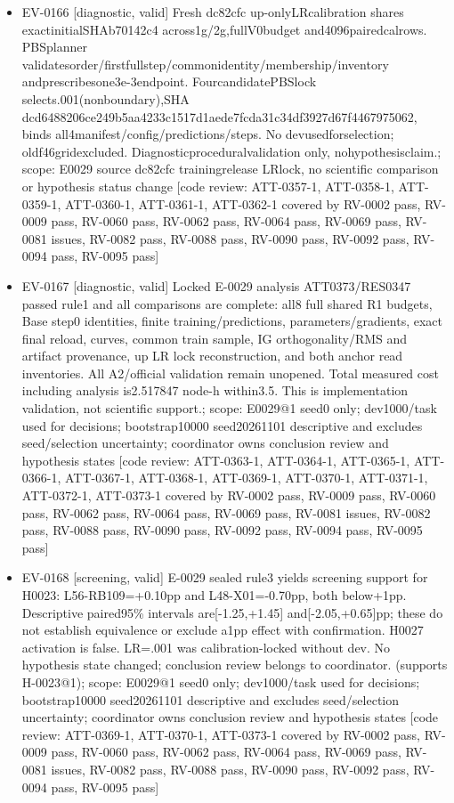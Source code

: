 \documentclass[11pt]{article}
\begin{document}
\begin{itemize}
\item EV-0166 [diagnostic, valid] Fresh dc82cfc up-onlyLRcalibration shares exactinitialSHAb70142c4 across1g/2g,fullV0budget and4096pairedcalrows. PBSplanner validatesorder/firstfullstep/commonidentity/membership/inventory andprescribesone3e-3endpoint. FourcandidatePBSlock selects.001(nonboundary),SHA dcd6488206ce249b5aa4233c1517d1aede7fcda31c34df3927d67f4467975062, binds all4manifest/config/predictions/steps. No devusedforselection; oldf46gridexcluded. Diagnosticproceduralvalidation only, nohypothesisclaim.; scope: E0029 source dc82cfc trainingrelease LRlock, no scientific comparison or hypothesis status change [code review: ATT-0357-1, ATT-0358-1, ATT-0359-1, ATT-0360-1, ATT-0361-1, ATT-0362-1 covered by RV-0002 pass, RV-0009 pass, RV-0060 pass, RV-0062 pass, RV-0064 pass, RV-0069 pass, RV-0081 issues, RV-0082 pass, RV-0088 pass, RV-0090 pass, RV-0092 pass, RV-0094 pass, RV-0095 pass]
\item EV-0167 [diagnostic, valid] Locked E-0029 analysis ATT0373/RES0347 passed rule1 and all comparisons are complete: all8 full shared R1 budgets, Base step0 identities, finite training/predictions, parameters/gradients, exact final reload, curves, common train sample, IG orthogonality/RMS and artifact provenance, up LR lock reconstruction, and both anchor read inventories. All A2/official validation remain unopened. Total measured cost including analysis is2.517847 node-h within3.5. This is implementation validation, not scientific support.; scope: E0029@1 seed0 only; dev1000/task used for decisions; bootstrap10000 seed20261101 descriptive and excludes seed/selection uncertainty; coordinator owns conclusion review and hypothesis states [code review: ATT-0363-1, ATT-0364-1, ATT-0365-1, ATT-0366-1, ATT-0367-1, ATT-0368-1, ATT-0369-1, ATT-0370-1, ATT-0371-1, ATT-0372-1, ATT-0373-1 covered by RV-0002 pass, RV-0009 pass, RV-0060 pass, RV-0062 pass, RV-0064 pass, RV-0069 pass, RV-0081 issues, RV-0082 pass, RV-0088 pass, RV-0090 pass, RV-0092 pass, RV-0094 pass, RV-0095 pass]
\item EV-0168 [screening, valid] E-0029 sealed rule3 yields screening support for H0023: L56-RB109=+0.10pp and L48-X01=-0.70pp, both below+1pp. Descriptive paired95\% intervals are[-1.25,+1.45] and[-2.05,+0.65]pp; these do not establish equivalence or exclude a1pp effect with confirmation. H0027 activation is false. LR=.001 was calibration-locked without dev. No hypothesis state changed; conclusion review belongs to coordinator. (supports H-0023@1); scope: E0029@1 seed0 only; dev1000/task used for decisions; bootstrap10000 seed20261101 descriptive and excludes seed/selection uncertainty; coordinator owns conclusion review and hypothesis states [code review: ATT-0369-1, ATT-0370-1, ATT-0373-1 covered by RV-0002 pass, RV-0009 pass, RV-0060 pass, RV-0062 pass, RV-0064 pass, RV-0069 pass, RV-0081 issues, RV-0082 pass, RV-0088 pass, RV-0090 pass, RV-0092 pass, RV-0094 pass, RV-0095 pass]

\end{itemize}
\end{document}
